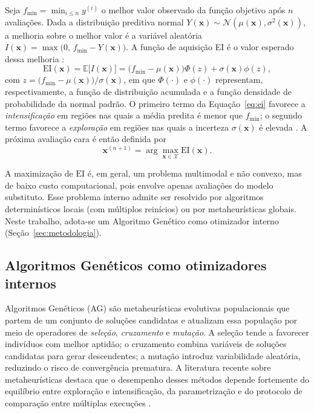 Seja $f_{\min} = \min_{i \le n} y^{(i)}$ o melhor valor observado da função objetivo após $n$ avaliações. Dada a distribuição preditiva normal $Y(\bm{x}) \sim \mathcal{N}(\mu(\bm{x}), \sigma^2(\bm{x}))$, a melhoria sobre o melhor valor é a variável aleatória $I(\bm{x}) = \max\bigl(0,\, f_{\min} - Y(\bm{x})\bigr)$. A função de aquisição EI é o valor esperado dessa melhoria :
\begin{equation}
    \mathrm{EI}(\bm{x}) = \mathbb{E}\bigl[I(\bm{x})\bigr]
    = \bigl(f_{\min} - \mu(\bm{x})\bigr) \Phi(z) + \sigma(\bm{x}) \phi(z),
    \label{eq:ei}
\end{equation}
com $z = \bigl(f_{\min} - \mu(\bm{x})\bigr)/\sigma(\bm{x})$, em que $\Phi(\cdot)$ e $\phi(\cdot)$ representam, respectivamente, a função de distribuição acumulada e a função densidade de probabilidade da normal padrão. O primeiro termo da Equação~\eqref{eq:ei} favorece a \textit{intensificação} em regiões nas quais a média predita é menor que $f_{\min}$; o segundo termo favorece a \textit{exploração} em regiões nas quais a incerteza $\sigma(\bm{x})$ é elevada . A próxima avaliação cara é então definida por
\begin{equation}
    \bm{x}^{(n+1)} = \arg\max_{\bm{x} \in \mathcal{X}} \mathrm{EI}(\bm{x}).
    \label{eq:ego_step}
\end{equation}

A maximização de $\mathrm{EI}$ é, em geral, um problema multimodal e não convexo, mas de baixo custo computacional, pois envolve apenas avaliações do modelo substituto. Esse problema interno admite ser resolvido por algoritmos determinísticos locais (com múltiplos reinícios) ou por metaheurísticas globais. Neste trabalho, adota-se um Algoritmo Genético como otimizador interno (Seção~\ref{sec:metodologia}).

\subsection{Algoritmos Genéticos como otimizadores internos}
\label{sec:fund_ag}

Algoritmos Genéticos (AG) são metaheurísticas evolutivas populacionais que partem de um conjunto de soluções candidatas e atualizam essa população por meio de operadores de \textit{seleção}, \textit{cruzamento} e \textit{mutação}. A seleção tende a favorecer indivíduos com melhor aptidão; o cruzamento combina variáveis de soluções candidatas para gerar descendentes; a mutação introduz variabilidade aleatória, reduzindo o risco de convergência prematura. A literatura recente sobre metaheurísticas destaca que o desempenho desses métodos depende fortemente do equilíbrio entre exploração e intensificação, da parametrização e do protocolo de comparação entre múltiplas execuções .

